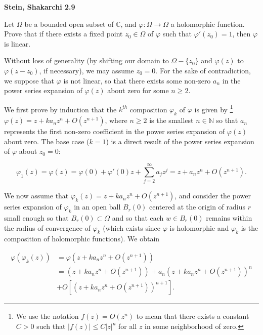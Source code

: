 \textbf{Stein, Shakarchi 2.9}

Let $\Omega$ be a bounded open subset of $\mathbb{C}$, and $\varphi: \Omega \to \Omega$ a holomorphic function. Prove 
that if there exists a fixed point $z_0 \in \Omega$ of $\varphi$ such that $\varphi'(z_0) = 1$, then $\varphi$ is 
linear.

\begin{solution}
    Without loss of generality (by shifting our domain to $\Omega - \{z_0\}$ and $\varphi(z)$ to $\varphi(z - z_0)$, if 
    necessary), we may assume $z_0 = 0$. For the sake of contradiction, we suppose that $\varphi$ is not linear, so that
    there exists some non-zero $a_n$ in the power series expansion of $\varphi(z)$ about zero for some $n \ge 2$.
    
    We first prove by induction that the $k^{th}$ composition $\varphi_k$ of 
    $\varphi$ is given by \footnote{
        We use the notation $f(z) = O(z^n)$ to mean that there exists a constant $C > 0$ such that $|f(z)| \le C |z|^n$ 
        for all $z$ in some neighborhood of zero.
    } $\varphi(z) = z + k a_n z^n + O(z^{n+1})$, where $n \ge 2$ is the smallest $n \in \mathbb{N}$ 
    so that $a_n$ represents the first non-zero coefficient in the power series expansion of $\varphi(z)$ about zero. 
    The base case ($k = 1$) is a direct result of the power series expansion of $\varphi$ about $z_0 = 0$:

    $$
    \varphi_1(z) = \varphi(z) = \varphi(0) + \varphi'(0) z + \sum_{j=2}^{\infty} a_j z^j = z + a_n z^n + O\left(z^{n+1}\right).
    $$

    We now assume that $\varphi_k(z) = z + k a_n z^n + O(z^{n+1})$, and consider the power series expansion of 
    $\varphi_k$ in an open ball $B_r(0)$ centered at the origin of radius $r$ small enough so that 
    $B_r(0) \subset \Omega$ and so that each $w \in B_r(0)$ remains within the radius of convergence of $\varphi_k$ 
    (which exists since $\varphi$ is holomorphic and $\varphi_k$ is the composition of holomorphic functions). We obtain

    \begin{align*}
        \varphi(\varphi_k(z)) &= \varphi\left(z + k a_n z^n + O\left(z^{n+1}\right)\right) \\
                              &= \left(z + k a_n z^n + O\left(z^{n+1}\right)\right) 
                               + a_n \left(z + k a_n z^n + O\left(z^{n+1}\right)\right)^n \\
                              & + O\left[\left(z + k a_n z^n + O\left(z^{n+1}\right)\right)^{n+1}\right].
    \end{align*}


\end{solution}
